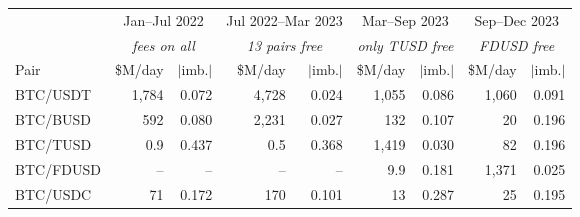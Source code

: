\begin{tabular}{lrrrrrrrr}
\toprule
 & \multicolumn{2}{c}{Jan--Jul 2022} & \multicolumn{2}{c}{Jul 2022--Mar 2023} & \multicolumn{2}{c}{Mar--Sep 2023} & \multicolumn{2}{c}{Sep--Dec 2023}\\
 & \multicolumn{2}{c}{\emph{fees on all}} & \multicolumn{2}{c}{\emph{13 pairs free}} & \multicolumn{2}{c}{\emph{only TUSD free}} & \multicolumn{2}{c}{\emph{FDUSD free}}\\
\cmidrule(lr){2-3}\cmidrule(lr){4-5}\cmidrule(lr){6-7}\cmidrule(lr){8-9}Pair & \$M/day & $|$imb.$|$ & \$M/day & $|$imb.$|$ & \$M/day & $|$imb.$|$ & \$M/day & $|$imb.$|$\\
\midrule
BTC/USDT & 1,784 & 0.072 & 4,728 & 0.024 & 1,055 & 0.086 & 1,060 & 0.091\\
BTC/BUSD & 592 & 0.080 & 2,231 & 0.027 & 132 & 0.107 & 20 & 0.196\\
BTC/TUSD & 0.9 & 0.437 & 0.5 & 0.368 & 1,419 & 0.030 & 82 & 0.196\\
BTC/FDUSD & -- & -- & -- & -- & 9.9 & 0.181 & 1,371 & 0.025\\
BTC/USDC & 71 & 0.172 & 170 & 0.101 & 13 & 0.287 & 25 & 0.195\\
\bottomrule
\end{tabular}
